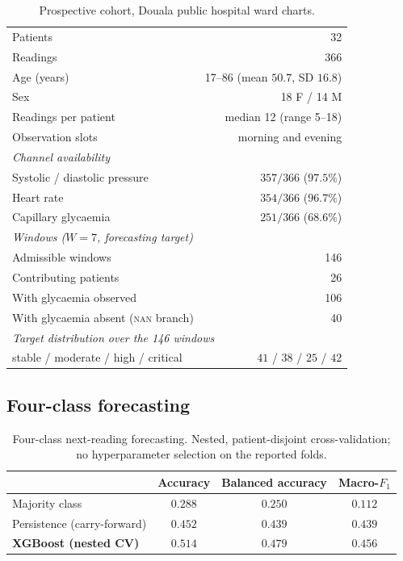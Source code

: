\documentclass[11pt,a4paper]{article}
\begin{document}
\begin{table}[htbp]
\centering
\caption{Prospective cohort, Douala public hospital ward charts.}
\label{tab:cohort}
\small
\begin{tabular}{lr}
\toprule
Patients & 32 \\
Readings & 366 \\
Age (years) & 17--86 (mean $50.7$, SD $16.8$) \\
Sex & 18 F / 14 M \\
Readings per patient & median 12 (range 5--18) \\
Observation slots & morning and evening \\
\midrule
\multicolumn{2}{l}{\emph{Channel availability}}\\
\quad Systolic / diastolic pressure & $357/366$ \quad($97.5\%$) \\
\quad Heart rate & $354/366$ \quad($96.7\%$) \\
\quad Capillary glycaemia & $251/366$ \quad($68.6\%$) \\
\midrule
\multicolumn{2}{l}{\emph{Windows ($W=7$, forecasting target)}}\\
\quad Admissible windows & 146 \\
\quad Contributing patients & 26 \\
\quad With glycaemia observed & 106 \\
\quad With glycaemia absent (\textsc{nan} branch) & 40 \\
\midrule
\multicolumn{2}{l}{\emph{Target distribution over the 146 windows}}\\
\quad \textsf{stable} / \textsf{moderate} / \textsf{high} / \textsf{critical}
  & $41$ / $38$ / $25$ / $42$ \\
\bottomrule
\end{tabular}
\end{table}

\subsection{Four-class forecasting}

\begin{table}[htbp]
\centering
\caption{Four-class next-reading forecasting. Nested, patient-disjoint
cross-validation; no hyperparameter selection on the reported folds.}
\label{tab:multiclass}
\small
\begin{tabular}{lccc}
\toprule
 & Accuracy & Balanced accuracy & Macro-$F_1$ \\
\midrule
Majority class            & $0.288$ & $0.250$ & $0.112$ \\
Persistence (carry-forward)& $0.452$ & $0.439$ & $0.439$ \\
\textbf{XGBoost (nested CV)} & $\mathbf{0.514}$ & $\mathbf{0.479}$ & $\mathbf{0.456}$ \\
\bottomrule
\end{tabular}
\end{table}
\end{document}

